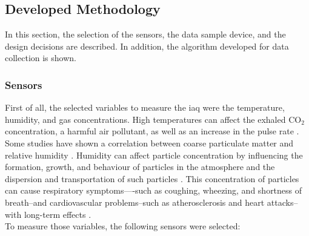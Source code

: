 \subsection{Developed Methodology}
\label{sec:methodology:dev_methodology}
\hspace{8pt}
In this section, the selection of the sensors, the data sample device, and the design decisions are described. In addition, the algorithm developed for data collection is shown.


\subsubsection{Sensors}
\label{sec:methodology:dev_methodology:sensors}
\hspace{8pt}
First of all, the selected variables to measure the \acrshort{iaq} were the temperature, humidity, and gas concentrations. High temperatures can affect the exhaled CO$_{2}$ concentration, a harmful air pollutant, as well as an increase in the pulse rate \cite{en14238127}. Some studies have shown a correlation between coarse particulate matter and relative humidity \cite{yang_2020, tanatachalert_2023, xing_2016}. Humidity can affect particle concentration by influencing the formation, growth, and behaviour of particles in the atmosphere and the dispersion and transportation of such particles \cite{tanatachalert_2023}. This concentration of particles can cause respiratory symptoms----such as coughing, wheezing, and shortness of breath--and cardiovascular problems--such as atherosclerosis and heart attacks--with long-term effects \cite{ahamed_2022, ding_2021, tang_2021}. \\

To measure those variables, the following sensors were selected:

